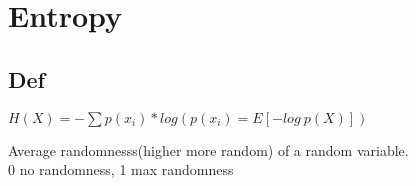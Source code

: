 \section{Entropy}
    \subsection*{Def}
        $H(X)=-\sum p(x_i)*log(p(x_i)=E[-log \ p(X)])$

        Average randomnesss(higher more random) of a random variable. \\
        0 no randomness, 1 max randomness

